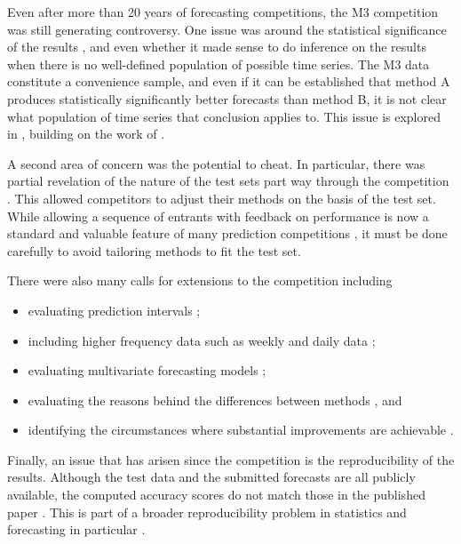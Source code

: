 \documentclass[11pt,a4paper,]{article}
\providecommand{\tightlist}{%
  \setlength{\itemsep}{0pt}\setlength{\parskip}{0pt}}
\begin{document}
Even after more than 20 years of forecasting competitions, the M3 competition was still generating controversy. One issue was around the statistical significance of the results \autocite{Stekler01}, and even whether it made sense to do inference on the results when there is no well-defined population of possible time series. The M3 data constitute a convenience sample, and even if it can be established that method A produces statistically significantly better forecasts than method B, it is not clear what population of time series that conclusion applies to. This issue is explored in \textcite{SKAM2018}, building on the work of \textcite{m3pca}.

A second area of concern was the potential to cheat. In particular, there was partial revelation of the nature of the test sets part way through the competition \autocite{Goodrich2001}. This allowed competitors to adjust their methods on the basis of the test set. While allowing a sequence of entrants with feedback on performance is now a standard and valuable feature of many prediction competitions \autocite{AH11}, it must be done carefully to avoid tailoring methods to fit the test set.

There were also many calls for extensions to the competition including

\begin{itemize}
\tightlist
\item
  evaluating prediction intervals \autocite{Goodrich2001};
\item
  including higher frequency data such as weekly and daily data \autocite{Goodrich2001};
\item
  evaluating multivariate forecasting models \autocite{Granger2001};
\item
  evaluating the reasons behind the differences between methods \autocite{Hyndman2001}, and
\item
  identifying the circumstances where substantial improvements are achievable \autocite{Fildes2001}.
\end{itemize}

Finally, an issue that has arisen since the competition is the reproducibility of the results. Although the test data and the submitted forecasts are all publicly available, the computed accuracy scores do not match those in the published paper \autocite{Hyndsightevidence}. This is part of a broader reproducibility problem in statistics \autocite{Peng2011} and forecasting in particular \autocites{evanschitzky2010replications}{boylan2015reproducibility}.
\end{document}
